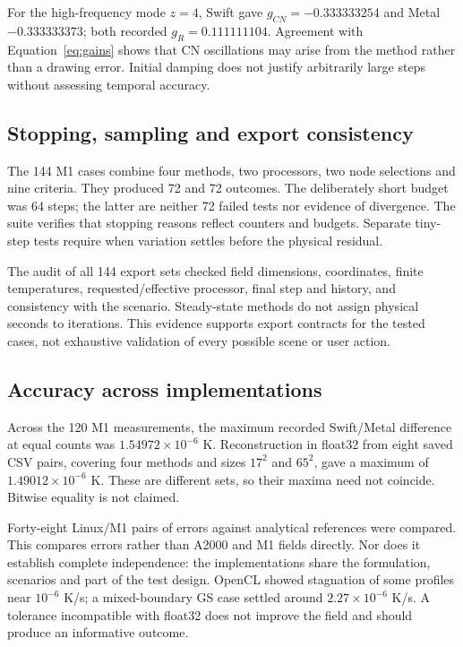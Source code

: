 \documentclass[11pt,a4paper]{article}
\newcommand{\code}[1]{\texttt{\detokenize{#1}}}
\begin{document}
For the high-frequency mode $z=4$, Swift gave $g_{CN}=-0.333333254$ and Metal $-0.333333373$; both recorded $g_R=0.111111104$. Agreement with Equation~\eqref{eq:gains} shows that CN oscillations may arise from the method rather than a drawing error. Initial damping does not justify arbitrarily large steps without assessing temporal accuracy.

\subsection{Stopping, sampling and export consistency}
The 144 M1 cases combine four methods, two processors, two node selections and nine criteria. They produced 72 \code{converged} and 72 \code{max_steps} outcomes. The deliberately short budget was 64 steps; the latter are neither 72 failed tests nor evidence of divergence. The suite verifies that stopping reasons reflect counters and budgets. Separate tiny-step tests require \code{criterion_met} when variation settles before the physical residual.

The audit of all 144 export sets checked field dimensions, coordinates, finite temperatures, requested/effective processor, final step and history, and consistency with the scenario. Steady-state methods do not assign physical seconds to iterations. This evidence supports export contracts for the tested cases, not exhaustive validation of every possible scene or user action.

\subsection{Accuracy across implementations}
Across the 120 M1 measurements, the maximum recorded Swift/Metal difference at equal counts was $1.54972\times10^{-6}$ K. Reconstruction in float32 from eight saved CSV pairs, covering four methods and sizes $17^2$ and $65^2$, gave a maximum of $1.49012\times10^{-6}$ K. These are different sets, so their maxima need not coincide. Bitwise equality is not claimed.

Forty-eight Linux/M1 pairs of errors against analytical references were compared. This compares errors rather than A2000 and M1 fields directly. Nor does it establish complete independence: the implementations share the formulation, scenarios and part of the test design. OpenCL showed stagnation of some profiles near $10^{-6}$ K/s; a mixed-boundary GS case settled around $2.27\times10^{-6}$ K/s. A tolerance incompatible with float32 does not improve the field and should produce an informative outcome.
\end{document}
